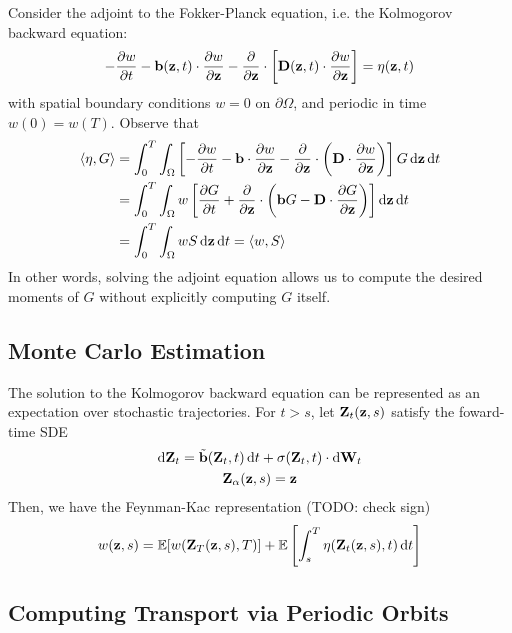 \documentclass[]{article}
\begin{document}
Consider the adjoint to the Fokker-Planck equation, i.e. the Kolmogorov backward equation:
\begin{equation}
	-\pdv{w}{t} -\vb{b}(\vb{z},t) \cdot \pdv{w}{\vb{z}} - \pdv{\vb{z}} \cdot \left[\vb{D}(\vb{z},t) \cdot \pdv{w}{\vb{z}}\right] = \eta(\vb{z},t)
\end{equation}
with spatial boundary conditions \(w = 0\) on \(\partial \Omega\), and periodic in time \(w(0) = w(T)\).
Observe that
\begin{align*}
	\langle \eta, G \rangle
	&= \int_{0}^{T} \int_{\Omega} \left[-\pdv{w}{t} -\vb{b} \cdot \pdv{w}{\vb{z}} - \pdv{\vb{z}} \cdot \left(\vb{D} \cdot \pdv{w}{\vb{z}}\right)\right] G \dd{\vb{z}} \dd{t} \\
	&= \int_{0}^{T} \int_{\Omega} w \left[\pdv{G}{t} + \pdv{\vb{z}} \cdot \left(\vb{b} G - \vb{D} \cdot \pdv{G}{\vb{z}}\right)\right] \dd{\vb{z}} \dd{t} \\
	&= \int_{0}^{T} \int_{\Omega} w S \dd{\vb{z}} \dd{t} = \langle w, S \rangle
\end{align*}
In other words, solving the adjoint equation allows us to compute the desired moments of \(G\) without explicitly computing \(G\) itself.

\subsection{Monte Carlo Estimation}

The solution to the Kolmogorov backward equation can be represented as an expectation over stochastic trajectories.
For \(t > s\), let \(\vb{Z}_t(\vb{z},s)\) satisfy the foward-time SDE
\begin{equation}
	\begin{gathered}
		\dd{\vb{Z}_t} = \tilde{\vb{b}}(\vb{Z}_t, t) \dd{t} + \sigma(\vb{Z}_t, t) \cdot \dd{\vb{W}_t} \\
		\vb{Z}_\alpha(\vb{z}, s) = \vb{z}
	\end{gathered}
\end{equation}
Then, we have the Feynman-Kac representation (TODO: check sign)
\begin{equation*}
	w(\vb{z}, s) = \mathbb{E}[w(\vb{Z}_T(\vb{z},s), T)] + \mathbb{E}\left[\int_{s}^{T} \eta(\vb{Z}_t(\vb{z}, s), t) \dd{t}\right]
\end{equation*}

\subsection{Computing Transport via Periodic Orbits}
\end{document}
